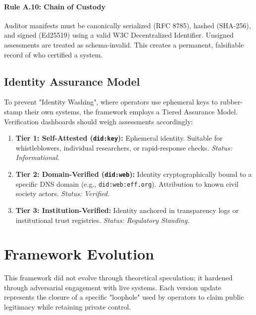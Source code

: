 \documentclass{article}
\begin{document}
\paragraph{Rule A.10: Chain of Custody}
Auditor manifests must be canonically serialized (RFC 8785), hashed (SHA-256), and signed (Ed25519) using a valid W3C Decentralized Identifier. Unsigned assessments are treated as schema-invalid. This creates a permanent, falsifiable record of who certified a system.

\subsection{Identity Assurance Model}

To prevent "Identity Washing", where operators use ephemeral keys to rubber-stamp their own systems, the framework employs a Tiered Assurance Model. Verification dashboards should weigh assessments accordingly:

\begin{enumerate}
    \item \textbf{Tier 1: Self-Attested (\texttt{did:key}):} Ephemeral identity. Suitable for whistleblowers, individual researchers, or rapid-response checks. \textit{Status: Informational.}
    \item \textbf{Tier 2: Domain-Verified (\texttt{did:web}):} Identity cryptographically bound to a specific DNS domain (e.g., \texttt{did:web:eff.org}). Attribution to known civil society actors. \textit{Status: Verified.}
    \item \textbf{Tier 3: Institution-Verified:} Identity anchored in transparency logs or institutional trust registries. \textit{Status: Regulatory Standing.}
\end{enumerate}

\section{Framework Evolution}
\label{appendix:evolution}

This framework did not evolve through theoretical speculation; it hardened through adversarial engagement with live systems. Each version update represents the closure of a specific "loophole" used by operators to claim public legitimacy while retaining private control.
\end{document}

